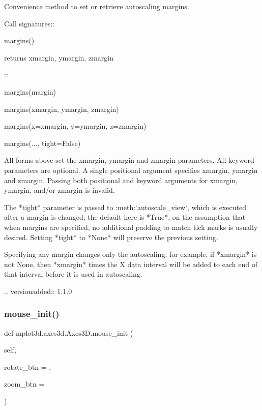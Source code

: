 \begin{DoxyVerb}
\begin{DoxyVerb}Convenience method to set or retrieve autoscaling margins.

Call signatures::

    margins()

returns xmargin, ymargin, zmargin

::

    margins(margin)

    margins(xmargin, ymargin, zmargin)

    margins(x=xmargin, y=ymargin, z=zmargin)

    margins(..., tight=False)

All forms above set the xmargin, ymargin and zmargin
parameters. All keyword parameters are optional.  A single
positional argument specifies xmargin, ymargin and zmargin.
Passing both positional and keyword arguments for xmargin,
ymargin, and/or zmargin is invalid.

The *tight* parameter
is passed to :meth:`autoscale_view`, which is executed after
a margin is changed; the default here is *True*, on the
assumption that when margins are specified, no additional
padding to match tick marks is usually desired.  Setting
*tight* to *None* will preserve the previous setting.

Specifying any margin changes only the autoscaling; for example,
if *xmargin* is not None, then *xmargin* times the X data
interval will be added to each end of that interval before
it is used in autoscaling.

.. versionadded:: 1.1.0
\end{DoxyVerb}
 \mbox{\label{classmplot3d_1_1axes3d_1_1Axes3D_a62b6f8a4ada530fadae25b1705e400d3}} 
\subsubsection{\texorpdfstring{mouse\+\_\+init()}{mouse\_init()}}
{\footnotesize\ttfamily def mplot3d.\+axes3d.\+Axes3\+D.\+mouse\+\_\+init (\begin{DoxyParamCaption}\item[{}]{self,  }\item[{}]{rotate\+\_\+btn = {},  }\item[{}]{zoom\+\_\+btn = {} }\end{DoxyParamCaption})}


\end{DoxyVerb}

